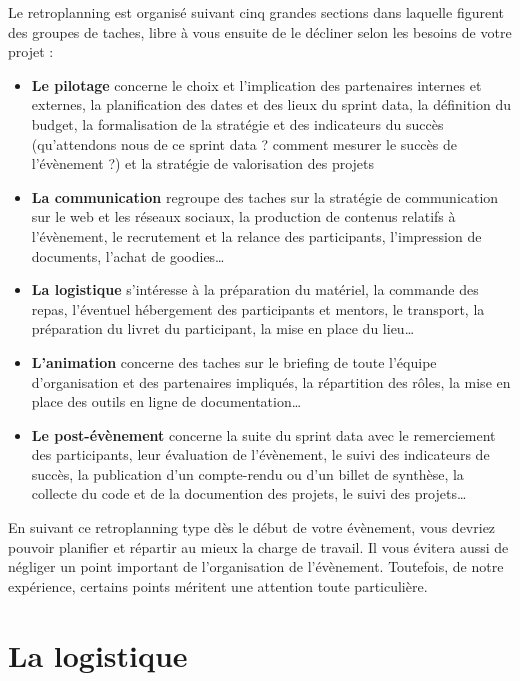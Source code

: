 \documentclass[]{book}
\begin{document}
Le retroplanning est organisé suivant cinq grandes sections dans
laquelle figurent des groupes de taches, libre à vous ensuite de le
décliner selon les besoins de votre projet :

\begin{itemize}
\item
  \textbf{Le pilotage} concerne le choix et l'implication des
  partenaires internes et externes, la planification des dates et des
  lieux du sprint data, la définition du budget, la formalisation de la
  stratégie et des indicateurs du succès (qu'attendons nous de ce sprint
  data ? comment mesurer le succès de l'évènement ?) et la stratégie de
  valorisation des projets
\item
  \textbf{La communication} regroupe des taches sur la stratégie de
  communication sur le web et les réseaux sociaux, la production de
  contenus relatifs à l'évènement, le recrutement et la relance des
  participants, l'impression de documents, l'achat de goodies\ldots{}
\item
  \textbf{La logistique} s'intéresse à la préparation du matériel, la
  commande des repas, l'éventuel hébergement des participants et
  mentors, le transport, la préparation du livret du participant, la
  mise en place du lieu\ldots{}
\item
  \textbf{L'animation} concerne des taches sur le briefing de toute
  l'équipe d'organisation et des partenaires impliqués, la répartition
  des rôles, la mise en place des outils en ligne de
  documentation\ldots{}
\item
  \textbf{Le post-évènement} concerne la suite du sprint data avec le
  remerciement des participants, leur évaluation de l'évènement, le
  suivi des indicateurs de succès, la publication d'un compte-rendu ou
  d'un billet de synthèse, la collecte du code et de la documention des
  projets, le suivi des projets\ldots{}
\end{itemize}

En suivant ce retroplanning type dès le début de votre évènement, vous
devriez pouvoir planifier et répartir au mieux la charge de travail. Il
vous évitera aussi de négliger un point important de l'organisation de
l'évènement. Toutefois, de notre expérience, certains points méritent
une attention toute particulière.

\section{La logistique}\label{la-logistique}
\end{document}
